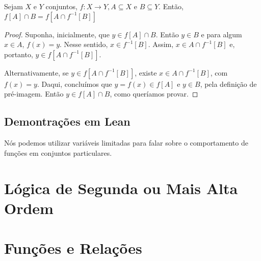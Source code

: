\begin{theorem}[Item 11]
    \label{exerc2}
    Sejam $X$ e $Y$ conjuntos, $f: X \to Y, A \subseteq X$ e $B \subseteq Y$. Então, 
    $f[A] \cap B = f[A \cap f^{-1}[B]]$
\end{theorem}

\begin{proof}
    Suponha, inicialmente, que $y \in f[A] \cap B$. Então $y \in B$ e para algum $x \in A$, $f(x) = y$.
    Nesse sentido, $x \in f^{-1}[B]$. Assim, $x \in A \cap f^{-1}[B]$ e, portanto, $y \in f[A \cap f^{-1}[B]]$.

    Alternativamente, se $y \in f[A \cap f^{-1}[B]]$, existe $x \in A \cap f^{-1}[B]$, com $f(x) = y$. 
    Daqui, concluímos que $y = f(x) \in f[A]$ e $y \in B$, pela definição de pré-imagem. Então $y \in f[A] \cap B$,
    como queríamos provar. 
\end{proof}

\subsection{Demontrações em Lean}

Nós podemos utilizar variáveis limitadas para falar sobre o comportamento de funções
em conjuntos particulares. 

\section{Lógica de Segunda ou Mais Alta Ordem}

\section{Funções e Relações}
